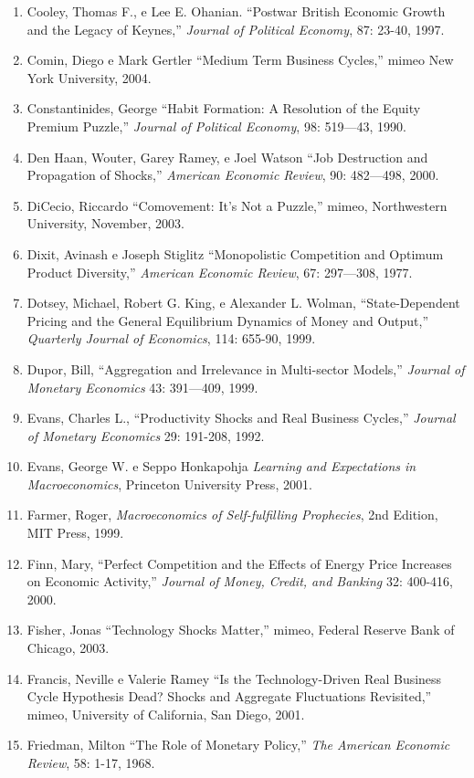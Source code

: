 \documentclass[12pt]{article}
\begin{document}
\begin{enumerate}
    \item Cooley, Thomas F., e Lee E. Ohanian. “Postwar British Economic Growth and the Legacy of Keynes,” \textit{Journal of Political Economy}, 87: 23-40, 1997.
    \item Comin, Diego e Mark Gertler “Medium Term Business Cycles,” mimeo New York University, 2004.
    \item Constantinides, George “Habit Formation: A Resolution of the Equity Premium Puzzle,” \textit{Journal of Political Economy}, 98: 519—43, 1990.
    \item Den Haan, Wouter, Garey Ramey, e Joel Watson “Job Destruction and Propagation of Shocks,” \textit{American Economic Review}, 90: 482—498, 2000.
    \item DiCecio, Riccardo “Comovement: It’s Not a Puzzle,” mimeo, Northwestern University, November, 2003.
    \item Dixit, Avinash e Joseph Stiglitz “Monopolistic Competition and Optimum Product Diversity,” \textit{American Economic Review}, 67: 297—308, 1977.
    \item Dotsey, Michael, Robert G. King, e Alexander L. Wolman, “State-Dependent Pricing and the General Equilibrium Dynamics of Money and Output,” \textit{Quarterly Journal of Economics}, 114: 655-90, 1999.
    \item Dupor, Bill, “Aggregation and Irrelevance in Multi-sector Models,” \textit{Journal of Monetary Economics} 43: 391—409, 1999.
    \item Evans, Charles L., “Productivity Shocks and Real Business Cycles,” \textit{Journal of Monetary Economics} 29: 191-208, 1992.
    \item Evans, George W. e Seppo Honkapohja \textit{Learning and Expectations in Macroeconomics}, Princeton University Press, 2001.
    \item Farmer, Roger, \textit{Macroeconomics of Self-fulfilling Prophecies}, 2nd Edition, MIT Press, 1999.
    \item Finn, Mary, “Perfect Competition and the Effects of Energy Price Increases on Economic Activity,” \textit{Journal of Money, Credit, and Banking} 32: 400-416, 2000.
    \item Fisher, Jonas “Technology Shocks Matter,” mimeo, Federal Reserve Bank of Chicago, 2003.
    \item Francis, Neville e Valerie Ramey “Is the Technology-Driven Real Business Cycle Hypothesis Dead? Shocks and Aggregate Fluctuations Revisited,” mimeo, University of California, San Diego, 2001.
    \item Friedman, Milton “The Role of Monetary Policy,” \textit{The American Economic Review}, 58: 1-17, 1968.

\end{enumerate}
\end{document}
